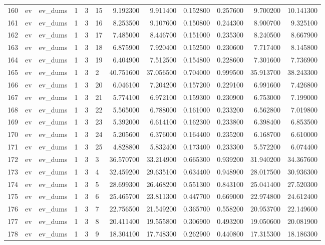 \begin{tabular}{llllllrrrrrr}
160 & ev & ev_dums & 1 & 3 & 15 & 9.192300 & 9.911400 & 0.152800 & 0.257600 & 9.700200 & 10.141300 \\
161 & ev & ev_dums & 1 & 3 & 16 & 8.253500 & 9.107600 & 0.150800 & 0.244300 & 8.900700 & 9.325100 \\
162 & ev & ev_dums & 1 & 3 & 17 & 7.485000 & 8.446700 & 0.151000 & 0.235300 & 8.240500 & 8.667900 \\
163 & ev & ev_dums & 1 & 3 & 18 & 6.875900 & 7.920400 & 0.152500 & 0.230600 & 7.717400 & 8.145800 \\
164 & ev & ev_dums & 1 & 3 & 19 & 6.404900 & 7.512500 & 0.154800 & 0.228600 & 7.301600 & 7.736900 \\
165 & ev & ev_dums & 1 & 3 & 2 & 40.751600 & 37.056500 & 0.704000 & 0.999500 & 35.913700 & 38.243300 \\
166 & ev & ev_dums & 1 & 3 & 20 & 6.046100 & 7.204200 & 0.157200 & 0.229100 & 6.991600 & 7.426800 \\
167 & ev & ev_dums & 1 & 3 & 21 & 5.774100 & 6.972100 & 0.159300 & 0.230900 & 6.753000 & 7.199000 \\
168 & ev & ev_dums & 1 & 3 & 22 & 5.565000 & 6.788000 & 0.161000 & 0.233200 & 6.562800 & 7.019800 \\
169 & ev & ev_dums & 1 & 3 & 23 & 5.392000 & 6.614100 & 0.162300 & 0.233800 & 6.398400 & 6.853500 \\
170 & ev & ev_dums & 1 & 3 & 24 & 5.205600 & 6.376000 & 0.164400 & 0.235200 & 6.168700 & 6.610000 \\
171 & ev & ev_dums & 1 & 3 & 25 & 4.828800 & 5.832400 & 0.173400 & 0.233300 & 5.572200 & 6.074400 \\
172 & ev & ev_dums & 1 & 3 & 3 & 36.570700 & 33.214900 & 0.665300 & 0.939200 & 31.940200 & 34.367600 \\
173 & ev & ev_dums & 1 & 3 & 4 & 32.459200 & 29.635100 & 0.634400 & 0.948900 & 28.017500 & 30.936300 \\
174 & ev & ev_dums & 1 & 3 & 5 & 28.699300 & 26.468200 & 0.551300 & 0.843100 & 25.041400 & 27.520300 \\
175 & ev & ev_dums & 1 & 3 & 6 & 25.465700 & 23.811300 & 0.447700 & 0.669000 & 22.974800 & 24.612400 \\
176 & ev & ev_dums & 1 & 3 & 7 & 22.756500 & 21.549200 & 0.365700 & 0.558200 & 20.953700 & 22.149600 \\
177 & ev & ev_dums & 1 & 3 & 8 & 20.411400 & 19.555800 & 0.306900 & 0.493200 & 19.050600 & 20.081900 \\
178 & ev & ev_dums & 1 & 3 & 9 & 18.304100 & 17.748300 & 0.262900 & 0.440800 & 17.315300 & 18.186300 \\

\end{tabular}
